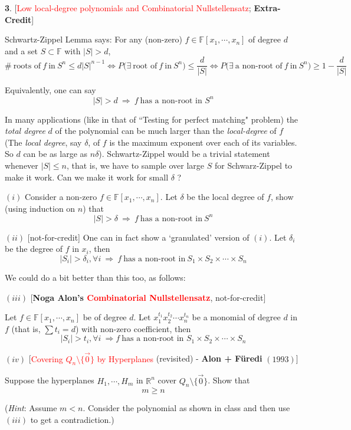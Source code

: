 \documentclass[10pt]{article}
\begin{document}
\textbf{3}. [\textcolor{red}{Low local-degree polynomials and Combinatorial Nullstellensatz}; \textbf{Extra-Credit}]\medskip

Schwartz-Zippel Lemma says: For any (non-zero) $f\in \mathbb{F}[x_1,\cdots, x_n]$ of degree $d$ and a set $S\subset \mathbb{F}$ with $|S|>d$, $$\boxed{\#~ \text{roots of}~f~\text{in}~S^n\le d|S|^{n-1}}\Leftrightarrow \boxed{P\big(\exists~ \text{root of}~ f~ \text{in}~ S^n\big)\le \frac{d}{|S|}}\Leftrightarrow \boxed{P\big(\exists~ \text{a non-root of}~ f~ \text{in}~ S^n\big)\ge 1-\frac{d}{|S|}}$$

Equivalently, one can say $$\boxed{|S|>d ~\Rightarrow~ f~ \text{has a non-root in}\,\, S^n}$$

In many applications (like in that of ``Testing for perfect matching" problem) the \emph{total degree} $d$ of the polynomial can be much larger than the \emph{local-degree} of $f$ (The \emph{local degree}, say $\delta$, of $f$ is the maximum exponent over each of its variables. So $d$ can be as large as $n\delta$). Schwartz-Zippel would be a trivial statement whenever $|S|\le n$, that is, we have to sample over large $S$ for Schwarz-Zippel to make it work. Can we make it work for small $\delta$ ?\medskip

$(i)$ Consider a non-zero $f\in \mathbb{F}[x_1,\cdots, x_n]$. Let $\delta$ be the local degree of $f$, show (using induction on $n$) that $$\boxed{|S|>\delta ~\Rightarrow~ f~ \text{has a non-root in}~ S^n}$$

$(ii)$ [not-for-credit] One can in fact show a `granulated' version of $(i)$. Let $\delta_i$ be the degree of $f$ in $x_i$, then $$\boxed{|S_i|>\delta_i, \forall i ~\Rightarrow~ f~ \text{has a non-root in}~ S_1\times S_2\times\cdots \times S_n}$$

We could do a bit better than this too, as follows:\medskip

$(iii)$ [\textbf{Noga Alon's \textcolor{red}{Combinatorial Nullstellensatz}}, not-for-credit]\medskip

Let $f\in \mathbb{F}[x_1,\cdots, x_n]$ be of degree $d$. Let $x_1^{t_1}x_2^{t_2}\cdots x_n^{t_n}$ be a monomial of degree $d$ in $f$ (that is, $\sum t_i=d$) with non-zero coefficient, then $$\boxed{|S_i|>t_i, \forall i ~\Rightarrow f~ \text{has a non-root in}\,\, S_1\times S_2\times\cdots \times S_n}$$

$(iv)$ [\textcolor{red}{Covering $Q_n\setminus \{\overrightarrow{0}\}$ by Hyperplanes} (revisited) - \textbf{Alon + F\"uredi} $(1993)$]\smallskip

Suppose the hyperplanes $H_1,\cdots, H_m$ in $\mathbb{R}^n$ cover $Q_n\setminus \{\overrightarrow{0}\}$. Show that $$m\ge n$$

(\emph{Hint}: Assume $m<n$. Consider the polynomial as shown in class and then use $(iii)$ to get a contradiction.)
\end{document}
